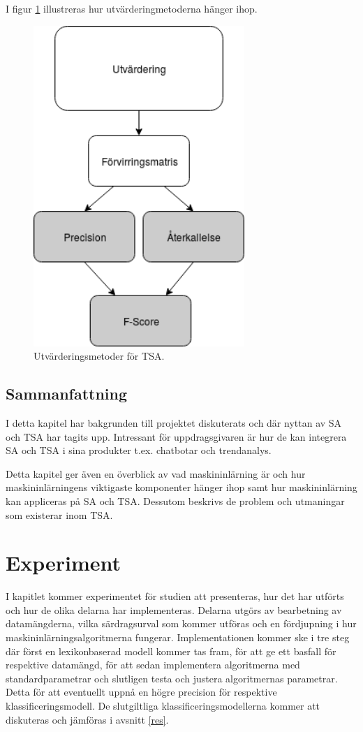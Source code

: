 \documentclass{kaumasters} %
\begin{document}
I figur \ref{fig:utv} illustreras hur utvärderingmetoderna hänger ihop.

\begin{figure}[h]
\includegraphics[width=8cm]{utvardering}
\centering
\caption{Utvärderingsmetoder för TSA.}
\label{fig:utv}
\end{figure}


\section{Sammanfattning} \label{BACKsum}
I detta kapitel har bakgrunden till projektet diskuterats och där nyttan av SA och TSA har tagits upp. Intressant för uppdragsgivaren är hur de kan integrera SA och TSA i sina produkter t.ex. chatbotar och trendanalys. 

Detta kapitel ger även en överblick av vad maskininlärning är och hur maskininlärningens viktigaste komponenter hänger ihop samt hur maskininlärning kan appliceras på SA och TSA. Dessutom beskrivs de problem och utmaningar som existerar inom TSA. 

\chapter{Experiment}\label{exp}
I kapitlet kommer experimentet för studien att presenteras, hur det har utförts och hur de olika delarna har implementeras. Delarna utgörs av bearbetning av datamängderna, vilka särdragsurval som kommer utföras och en fördjupning i hur maskininlärningsalgoritmerna fungerar. Implementationen kommer ske i tre steg där först en lexikonbaserad modell kommer tas fram, för att ge ett basfall för respektive datamängd, för att sedan implementera algoritmerna med standardparametrar och slutligen testa och justera algoritmernas parametrar. Detta för att eventuellt uppnå en högre precision för respektive klassificeringsmodell. 
De slutgiltliga klassificeringsmodellerna kommer att diskuteras och jämföras i avsnitt \ref{res}.
\end{document}
